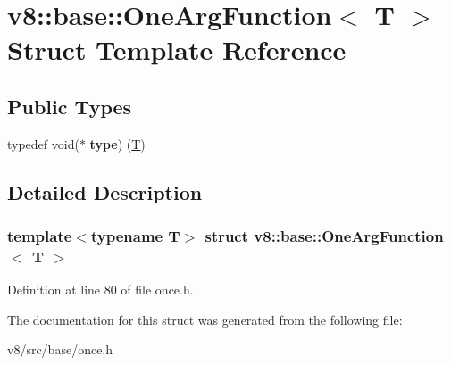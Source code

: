 \hypertarget{structv8_1_1base_1_1OneArgFunction}{}\section{v8\+:\+:base\+:\+:One\+Arg\+Function$<$ T $>$ Struct Template Reference}
\label{structv8_1_1base_1_1OneArgFunction}
\subsection*{Public Types}
\begin{DoxyCompactItemize}
\item 
\mbox{\label{structv8_1_1base_1_1OneArgFunction_a4b19686c2b01edf335876d1a849d85a0}} 
typedef void($\ast$ {\bfseries type}) (\mbox{\hyperlink{classv8_1_1internal_1_1torque_1_1T}{T}})
\end{DoxyCompactItemize}


\subsection{Detailed Description}
\subsubsection*{template$<$typename T$>$\newline
struct v8\+::base\+::\+One\+Arg\+Function$<$ T $>$}



Definition at line 80 of file once.\+h.



The documentation for this struct was generated from the following file\+:\begin{DoxyCompactItemize}
\item 
v8/src/base/once.\+h\end{DoxyCompactItemize}
